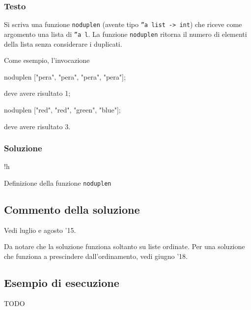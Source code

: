 \subsubsection{Testo}

Si scriva una funzione \texttt{noduplen} (avente tipo \texttt{''a list -> int}) che riceve come argomento una lista di \texttt{''a l}.
La funzione \texttt{noduplen} ritorna il numero di elementi della lista senza considerare i duplicati.

\medskip
Come esempio, l'invocazione

\begin{smlcode}
noduplen ["pera", "pera", "pera", "pera"];
\end{smlcode}

deve avere risultato 1;

\begin{smlcode}
noduplen ["red", "red", "green", "blue"];
\end{smlcode}

deve avere risultato 3.

\subsubsection{Soluzione}

\begin{listing}{!h}
\caption[]{Definizione della funzione \texttt{noduplen}}
\end{listing}

\subsection{Commento della soluzione}

Vedi luglio e agosto '15.

Da notare che la soluzione funziona soltanto su liste ordinate.
Per una soluzione che funziona a prescindere dall'ordinamento, vedi giugno '18.

\subsection*{Esempio di esecuzione}

TODO

